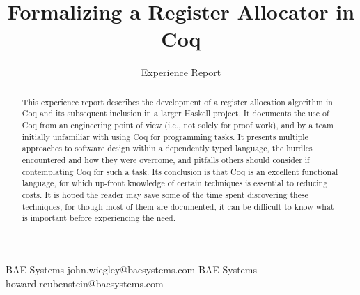 \documentclass[preprint]{sigplanconf}
\begin{document}
\setlength{\pdfpageheight}{\paperheight}
\setlength{\pdfpagewidth}{\paperwidth}



\exclusivelicense                %


\title{Formalizing a Register Allocator in Coq}
\subtitle{Experience Report}

           {BAE Systems}
           {john.wiegley@baesystems.com}
           {BAE Systems}
           {howard.reubenstein@baesystems.com}

\maketitle

\begin{abstract}
  This experience report describes the development of a register allocation
  algorithm in Coq and its subsequent inclusion in a larger Haskell project.
  It documents the use of Coq from an engineering point of view (i.e., not
  solely for proof work), and by a team initially unfamiliar with using Coq
  for programming tasks. It presents multiple approaches to software design
  within a dependently typed language, the hurdles encountered and how they
  were overcome, and pitfalls others should consider if contemplating Coq for
  such a task. Its conclusion is that Coq is an excellent functional language,
  for which up-front knowledge of certain techniques is essential to reducing
  costs. It is hoped the reader may save some of the time spent discovering
  these techniques, for though most of them are documented, it can be
  difficult to know what is important before experiencing the need.
\end{abstract}
\end{document}
